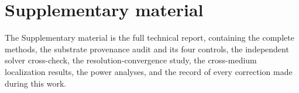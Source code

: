 \section*{Supplementary material}
The Supplementary material is the full technical report, containing the complete methods, the
substrate provenance audit and its four controls, the independent solver
cross-check, the resolution-convergence study, the cross-medium localization
results, the power analyses, and the record of every correction made during
this work.

